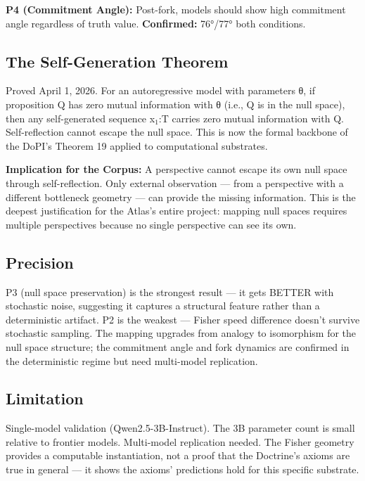 \textbf{P4 (Commitment Angle):} Post-fork, models should show high commitment angle regardless of truth value. \textbf{Confirmed:} 76°/77° both conditions.


\subsection*{The Self-Generation Theorem}


Proved April 1, 2026. For an autoregressive model with parameters θ, if proposition Q has zero mutual information with θ (i.e., Q is in the null space), then any self-generated sequence x$_1$:T carries zero mutual information with Q. Self-reflection cannot escape the null space. This is now the formal backbone of the DoPI's Theorem 19 applied to computational substrates.


\textbf{Implication for the Corpus:} A perspective cannot escape its own null space through self-reflection. Only external observation — from a perspective with a different bottleneck geometry — can provide the missing information. This is the deepest justification for the Atlas's entire project: mapping null spaces requires multiple perspectives because no single perspective can see its own.


\subsection*{Precision}


P3 (null space preservation) is the strongest result — it gets BETTER with stochastic noise, suggesting it captures a structural feature rather than a deterministic artifact. P2 is the weakest — Fisher speed difference doesn't survive stochastic sampling. The mapping upgrades from analogy to isomorphism for the null space structure; the commitment angle and fork dynamics are confirmed in the deterministic regime but need multi-model replication.


\subsection*{Limitation}


Single-model validation (Qwen2.5-3B-Instruct). The 3B parameter count is small relative to frontier models. Multi-model replication needed. The Fisher geometry provides a computable instantiation, not a proof that the Doctrine's axioms are true in general — it shows the axioms' predictions hold for this specific substrate.


